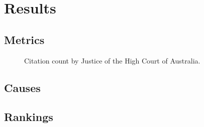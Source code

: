 \let\xn\xnote
\section{Results}

\subsection{Metrics}

\begin{figure}[htbp]
    \centering
    
    \caption{Citation count by Justice of the High Court of Australia.}
\end{figure}

\subsection{Causes}



\subsection{Rankings}






%     

%     

